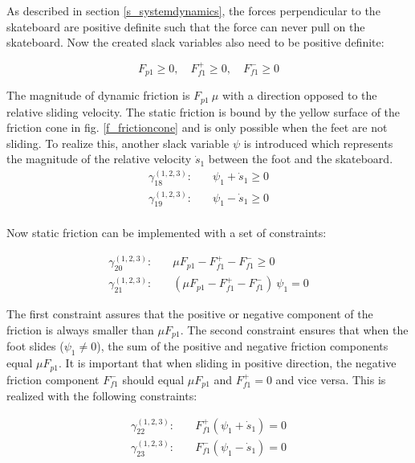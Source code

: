 \documentclass[default,iicol]{sn-jnl}
\begin{document}
{As described in section \ref{s_systemdynamics}, the forces perpendicular to the
skateboard are positive definite such that the force can never pull on the
skateboard. Now the created slack variables also need to be positive definite:

\begin{equation}
    F_{p1} \geq 0,\quad F_{f1}^+ \geq 0,\quad F_{f1}^- \geq 0
\end{equation}

The magnitude of dynamic friction is $F_{p1}\ \mu$ with a direction opposed to
the relative sliding velocity.
The static friction is bound by the yellow surface of the friction cone in fig.
\ref{f_frictioncone} and is only possible when the feet are not sliding.
To realize this, another slack variable $\psi$ is introduced which represents
the magnitude of the relative velocity $\dot s_1$ between the foot and the
skateboard.
%
\begin{equation}
\begin{split}
    \gamma_{18}^{(1,2,3)}: \quad & \psi_1 + \dot s_1  \geq 0 \\
    \gamma_{19}^{(1,2,3)}: \quad & \psi_1 - \dot s_1  \geq 0 \\
\end{split}
\end{equation}

Now static friction can be implemented with a set of constraints:

\begin{equation}
\begin{split}\label{e_frictioncontrol}
       \gamma_{20}^{(1,2,3)}: \quad & \mu F_{p1} - F_{f1}^+ - F_{f1}^- \geq 0 \\
       \gamma_{21}^{(1,2,3)}: \quad & (\mu F_{p1} - F_{f1}^+ - F_{f1}^-)\ \psi_1  = 0
\end{split}
\end{equation}

The first constraint assures that the positive or negative component of the
friction is always smaller than $\mu F_{p1}$. The second constraint ensures
that when the foot slides ($\psi_1 \not = 0$),  the sum of the positive and
negative friction components equal $\mu F_{p1}$. It is important that when
sliding in positive direction, the negative friction component $F_{f1}^-$
should equal $\mu F_{p1}$ and $F_{f1}^+=0$ and vice versa. This is realized
with the following constraints:

\begin{equation}
\begin{split}
    \gamma_{22}^{(1,2,3)}: \quad & F_{f1}^+ (\psi_1 + \dot s_1)  = 0 \\
    \gamma_{23}^{(1,2,3)}: \quad & F_{f1}^- (\psi_1 - \dot s_1)  = 0
\end{split}
\end{equation}

}
\end{document}
